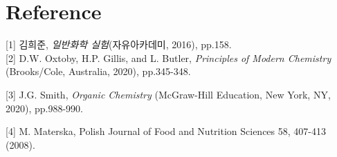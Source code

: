 \documentclass[%
 reprint,
 amsmath,amssymb,
 aps,
]{revtex4-2}
\begin{document}
\section{\label{sec:level1}Reference}
[1] 김희준, \textit{일반화학 실험}(자유아카데미, 2016), pp.158.\\

[2] D.W. Oxtoby, H.P. Gillis, and L. Butler, \textit{Principles of Modern Chemistry} (Brooks/Cole, Australia, 2020), pp.345-348.

[3] J.G. Smith, \textit{Organic Chemistry} (McGraw-Hill Education, New York, NY, 2020), pp.988-990. 

[4] M. Materska, Polish Journal of Food and Nutrition Sciences 58, 407-413 (2008). 
\end{document}
